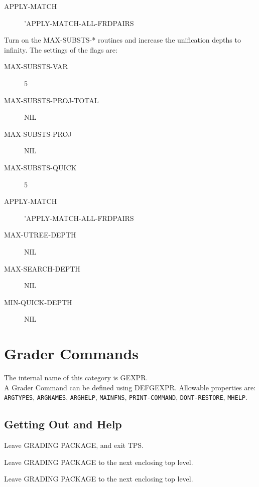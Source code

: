 \begin{description}
\begin{description}
\item[APPLY-MATCH] 'APPLY-MATCH-ALL-FRDPAIRS

\end{description}

\item[MSV-ON]  
Turn on the MAX-SUBSTS-* routines and increase
the unification depths to infinity. The settings of the flags are:
\begin{description}
\item[MAX-SUBSTS-VAR] 5

\item[MAX-SUBSTS-PROJ-TOTAL] NIL

\item[MAX-SUBSTS-PROJ] NIL

\item[MAX-SUBSTS-QUICK] 5

\item[APPLY-MATCH] 'APPLY-MATCH-ALL-FRDPAIRS

\item[MAX-UTREE-DEPTH] NIL

\item[MAX-SEARCH-DEPTH] NIL

\item[MIN-QUICK-DEPTH] NIL

\end{description}

\item
\end{description}
\chapter{Grader Commands}
The internal name of this category is 
GEXPR.\\
A Grader Command can be defined using DEFGEXPR.
Allowable properties are: \texttt{ARGTYPES}, \texttt{ARGNAMES}, \texttt{ARGHELP}, \texttt{MAINFNS}, \texttt{PRINT-COMMAND}, \texttt{DONT-RESTORE}, \texttt{MHELP}.

\section{Getting Out and Help}

\begin{description} 
\item[GR-EXIT]  
Leave GRADING PACKAGE, and exit TPS.

\item[GR-LEAVE]  
Leave GRADING PACKAGE to the next enclosing top level.

\item[LEAVE]  
Leave GRADING PACKAGE to the next enclosing top level.
\item
\end{description}

